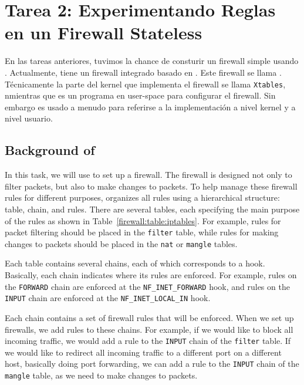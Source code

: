 \section{Tarea 2: Experimentando Reglas en un Firewall Stateless}

En las tareas anteriores, tuvimos la chance de consturir un firewall simple usando \netfilter. Actualmente, \linux tiene un firewall integrado basado en \netfilter. Este firewall se llama \iptables. Técnicamente la parte del kernel que implementa el firewall se llama  \texttt{Xtables}, nmientras que \iptables es un programa en user-space para configurar el firewall. Sin embargo \iptables es usado a menudo para referirse a la implementación a nivel kernel y a nivel usuario.



\subsection{Background of \iptables}

In this task, we will use \iptables to set up a firewall. 
The \iptables firewall is designed not only to filter packets, but also to make changes to
packets. To help manage these firewall rules for different purposes, \iptables organizes all
rules using a hierarchical structure: table, chain, and rules.
There are several tables, each specifying the main purpose of the rules as shown
in Table~\ref{firewall:table:iptables}.
For example, rules for packet filtering should be
placed in the \texttt{filter} table, while rules for making changes to packets should be placed
in the \texttt{nat} or \texttt{mangle} tables.

Each table contains several chains, each of which corresponds to a \netfilter hook. Basically,
each chain indicates where its rules are enforced. For example, rules on
the \texttt{FORWARD} chain are enforced at the \texttt{NF\_INET\_FORWARD} hook, and rules on
the \texttt{INPUT} chain are enforced at the  \texttt{NF\_INET\_LOCAL\_IN} hook.

Each chain contains a set of firewall rules that will be enforced.
When we set up firewalls, we add rules to these chains.
For example, if we would like to block all incoming \telnet traffic, we would
add a rule to the \texttt{INPUT} chain of the \texttt{filter} table.  If we
would like to redirect all incoming \telnet traffic to a different
port on a different host, basically doing port forwarding, we can add a rule to the
\texttt{INPUT} chain of the \texttt{mangle} table, as we need to make changes to packets.


